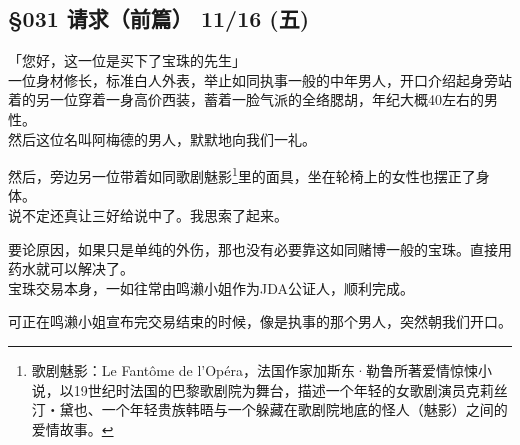 \subsection{§031 请求（前篇） 11/16 (五)}

「您好，这一位是买下了宝珠的先生」\\

一位身材修长，标准白人外表，举止如同执事一般的中年男人，开口介绍起身旁站着的另一位穿着一身高价西装，蓄着一脸气派的全络腮胡，年纪大概40左右的男性。\\

然后这位名叫阿梅德的男人，默默地向我们一礼。

然后，旁边另一位带着如同歌剧魅影\footnote{歌剧魅影：Le Fantôme de l'Opéra，法国作家加斯东·勒鲁所著爱情惊悚小说，以19世纪时法国的巴黎歌剧院为舞台，描述一个年轻的女歌剧演员克莉丝汀‧黛也、一个年轻贵族韩晤与一个躲藏在歌剧院地底的怪人（魅影）之间的爱情故事。}里的面具，坐在轮椅上的女性也摆正了身体。\\

说不定还真让三好给说中了。我思索了起来。

要论原因，如果只是单纯的外伤，那也没有必要靠这如同赌博一般的宝珠。直接用药水就可以解决了。\\

宝珠交易本身，一如往常由鸣濑小姐作为JDA公证人，顺利完成。

可正在鸣濑小姐宣布完交易结束的时候，像是执事的那个男人，突然朝我们开口。\\

